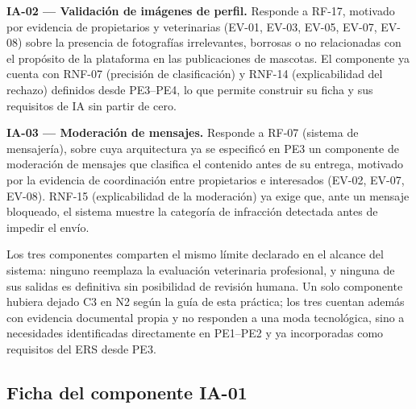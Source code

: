 \documentclass[journal,onecolumn]{IEEEtran}
\begin{document}
\textbf{IA-02 --- Validación de imágenes de perfil.} Responde a RF-17, motivado por evidencia de
propietarios y veterinarias (EV-01, EV-03, EV-05, EV-07, EV-08) sobre la presencia de
fotografías irrelevantes, borrosas o no relacionadas con el propósito de la plataforma en las
publicaciones de mascotas. El componente ya cuenta con RNF-07 (precisión de clasificación) y
RNF-14 (explicabilidad del rechazo) definidos desde PE3--PE4, lo que permite construir su ficha
y sus requisitos de IA sin partir de cero.

\textbf{IA-03 --- Moderación de mensajes.} Responde a RF-07 (sistema de mensajería), sobre cuya
arquitectura ya se especificó en PE3 un componente de moderación de mensajes que clasifica el
contenido antes de su entrega, motivado por la evidencia de coordinación entre propietarios e
interesados (EV-02, EV-07, EV-08). RNF-15 (explicabilidad de la moderación) ya exige que, ante
un mensaje bloqueado, el sistema muestre la categoría de infracción detectada antes de impedir
el envío.

Los tres componentes comparten el mismo límite declarado en el alcance del sistema: ninguno
reemplaza la evaluación veterinaria profesional, y ninguna de sus salidas es definitiva sin
posibilidad de revisión humana. Un solo componente hubiera dejado C3 en N2 según la guía de
esta práctica; los tres cuentan además con evidencia documental propia y no responden a una
moda tecnológica, sino a necesidades identificadas directamente en PE1--PE2 y ya incorporadas
como requisitos del ERS desde PE3.

\subsection{Ficha del componente IA-01}
\end{document}
